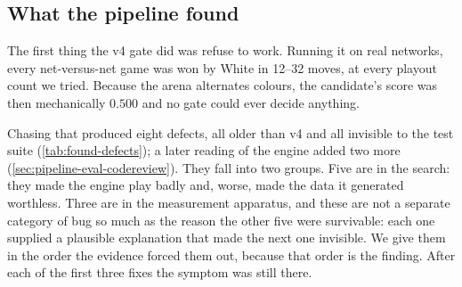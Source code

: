 \subsection{What the pipeline found}
\label{sec:pipeline-found}

The first thing the v4 gate did was refuse to work. Running it on real networks,
every net-versus-net game was won by White in 12--32 moves, at every playout
count we tried. Because the arena alternates colours, the candidate's score was
then mechanically $0.500$ and no gate could ever decide anything.

Chasing that produced eight defects, all older than v4 and all invisible to the
test suite (\cref{tab:found-defects}); a later reading of the engine added two
more (\cref{sec:pipeline-eval-codereview}). They fall into two groups. Five are in the
search: they made the engine play badly and, worse, made the data it generated
worthless. Three are in the measurement apparatus, and these are not a separate
category of bug so much as the reason the other five were survivable: each one
supplied a plausible explanation that made the next one invisible. We give them
in the order the evidence forced them out, because that order is the finding.
After each of the first three fixes the symptom was still there.

